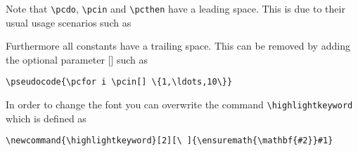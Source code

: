 \documentclass[a4paper]{report}
\begin{document}
Note that \lstinline{\pcdo}, \lstinline{\pcin} and \lstinline{\pcthen} have a leading space. This is due to their usual usage scenarios
such as
\begin{center}
\end{center}
Furthermore all constants have a trailing space. This can be removed by adding the optional parameter [] such as
\begin{center}
\end{center}
\begin{lstlisting}
\pseudocode{\pcfor i \pcin[] \{1,\ldots,10\}}
\end{lstlisting}

In order to change the font you can overwrite the command \lstinline{\highlightkeyword} which is defined as
\begin{lstlisting}
\newcommand{\highlightkeyword}[2][\ ]{\ensuremath{\mathbf{#2}}#1}
\end{lstlisting}
\end{document}
